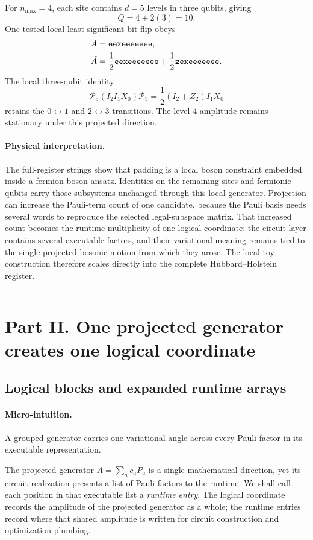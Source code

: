 \documentclass[10pt,twocolumn]{article}
\newcommand{\conceptbreak}{%
  \par\medskip\noindent
  {\color{black!30}\rule{\columnwidth}{0.35pt}}%
  \par\medskip}
\newcommand{\micro}{\paragraph{Micro-intuition.}}
\newcommand{\physical}{\paragraph{Physical interpretation.}}
\newcommand{\codeword}[1]{\texttt{\detokenize{#1}}}
\begin{document}
For \(n_{\max}=4\), each site contains \(d=5\) levels in three qubits, giving
\begin{equation}
Q=4+2(3)=10.
\label{eq:hh-ten-qubits}
\end{equation}
One tested local least-significant-bit flip obeys
\begin{align}
A&=\codeword{eexeeeeeee},\nonumber\\
\widetilde A
&=\frac12\codeword{eexeeeeeee}
+\frac12\codeword{zexeeeeeee}.
\label{eq:hh-nph4-projection}
\end{align}
The local three-qubit identity
\begin{equation}
\mathcal P_5(I_2I_1X_0)\mathcal P_5
=\frac12(I_2+Z_2)I_1X_0
\label{eq:five-level-projected-x}
\end{equation}
retains the \(0\leftrightarrow1\) and \(2\leftrightarrow3\) transitions. The
level \(4\) amplitude remains stationary under this projected direction.

\physical The full-register strings show that padding is a local boson
constraint embedded inside a fermion-boson ansatz. Identities on the remaining
sites and fermionic qubits carry those subsystems unchanged through this local
generator. Projection can increase the Pauli-term count of one candidate,
because the Pauli basis needs several words to reproduce the selected
legal-subspace matrix. That increased count becomes the runtime multiplicity of
one logical coordinate: the circuit layer contains several executable factors,
and their variational meaning remains tied to the single projected bosonic
motion from which they arose. The local toy construction therefore scales
directly into the complete Hubbard--Holstein register.

\conceptbreak

\section*{Part II. One projected generator creates one logical coordinate}

\subsection*{Logical blocks and expanded runtime arrays}

\micro A grouped generator carries one variational angle across every Pauli
factor in its executable representation.

The projected generator \(\widetilde A=\sum_a c_aP_a\) is a single
mathematical direction, yet its circuit realization presents a list of Pauli
factors to the runtime. We shall call each position in that executable list a
\emph{runtime entry}. The logical coordinate records the amplitude of the
projected generator as a whole; the runtime entries record where that shared
amplitude is written for circuit construction and optimization plumbing.
\end{document}
